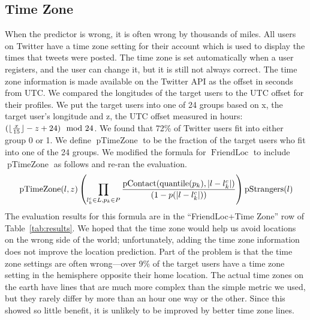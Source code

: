 \documentclass[letterpaper]{article}
\DeclareMathOperator{\pContact}{pContact}
\DeclareMathOperator{\pTimeZone}{pTimeZone}
\DeclareMathOperator{\pStrangers}{pStrangers}
\DeclareMathOperator{\FriendLoc}{FriendLoc}
\DeclareMathOperator{\quantile}{quantile}
\begin{document}
\ifdefined\THESIS
\subsection{Time Zone}
When the predictor is wrong, it is often wrong by thousands of miles.
%
All users on Twitter have a time zone setting for their account which is used
to display the times that tweets were posted.
%
The time zone is set automatically when a user registers, and the user can
change it, but it is still not always correct.
%
The time zone information is made available on the Twitter API as the offset
in seconds from UTC.
%
We compared the longitudes of the target users to the UTC offset for their
profiles.
%
We put the target users into one of 24 groups based on x, the target user's
longitude and z, the UTC offset measured in hours:
${(\lfloor {x\over15}\rfloor-z+24)\mod{24}}$.
%
We found that 72\% of Twitter users fit into either group 0 or 1.
%
We define $\pTimeZone$ to be the fraction of the target users who fit into one
of the 24 groups.
%
We modified the formula for $\FriendLoc$ to include $\pTimeZone$ as follows and
re-ran the evaluation.
\[
    \pTimeZone(l,z)
    \left(
        \prod_{l^c_k \in L,p_k \in P}
        {\pContact(\quantile(p_k),|l-l^c_k|) \over (1-p(|l-l^c_k|))}
    \right)
    \pStrangers(l)
\]
The evaluation results for this formula are in the ``FriendLoc+Time Zone'' row
of Table~\ref{tab:results}.
%
We hoped that the time zone would help us avoid locations on the wrong side of
the world; unfortunately, adding the time zone information does not improve the
location prediction.
%
Part of the problem is that the time zone settings are often wrong---over 9\% of
the target users have a time zone setting in the hemisphere opposite their home
location.
%
The actual time zones on the earth have lines that are much more complex than
the simple metric we used, but they rarely differ by more than an hour one way
or the other.
%
Since this showed so little benefit, it is unlikely to be improved by better
time zone lines.

\fi
\end{document}
